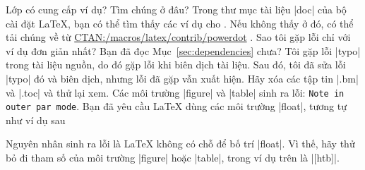 \begin{itemize}[leftmargin=0pt]
\question
Lớp  có cung cấp ví dụ? Tìm chúng ở đâu?
\answer
Trong thư mục tài liệu |doc| của bộ cài đặt \LaTeX, bạn có thể
tìm thấy các ví dụ cho . Nếu không thấy ở đó, có thể
tải chúng về từ \url{CTAN:/macros/latex/contrib/powerdot} \cite{CTAN}.
\question %
Sao tôi gặp lỗi chỉ với ví dụ đơn giản nhất?
\answer %
Bạn đã đọc Mục~\vref{sec:dependencies} chưa?
\question %
Tôi gặp lỗi |typo| trong tài liệu nguồn, do đó gặp lỗi khi biên dịch
tài liệu. Sau đó, tôi đã sửa lỗi |typo| đó và biên dịch, nhưng lỗi đã
gặp vẫn xuất hiện.
\answer %
Hãy xóa các tập tin |.bm| và |.toc| và thử lại xem.
\question
Các môi trường |figure| và |table| sinh ra lỗi: \texttt{Note in outer par mode}.
\answer
Bạn đã yêu cầu \LaTeX{} dùng các môi trường |float|, tương tự như ví dụ sau
\begin{example}
 \begin{figure}[htb]
\end{example}
Nguyên nhân sinh ra lỗi là \LaTeX{} không có chỗ để bố trí |float|.
Vì thế, hãy thử bỏ đi tham số của môi trường |figure| hoặc |table|,
trong ví dụ trên là |[htb]|.

\end{itemize}
